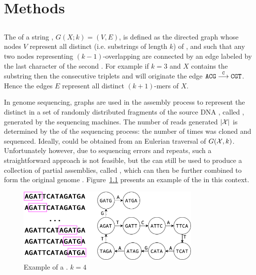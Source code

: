 \chapter{Methods}

\section{}
\label{sec:dBG}


The  of a string , $G(X;k)=(V,E)$, is defined as the directed graph whose nodes $V$ represent all distinct  (i.e. substrings of length $k$) of , and such that any two nodes representing $(k-1)$-overlapping  are connected by an edge labeled by the last character of the second \kmer. For example if $k=3$ and $X$ contains the substring  then the consecutive triplets  and  will originate the edge $\mathtt{ACG}\stackrel{\mathtt{C}}{\longrightarrow}\mathtt{CGT}$. Hence the edges $E$ represent all distinct $(k+1)$-mers of $X$. 

In genome sequencing, \dB graphs are used in the assembly process to represent the distinct  in a set \readset of randomly distributed fragments of the source DNA , called , generated by the sequencing machines. The number of reads generated $|\readset|$ is determined by the  of the sequencing process: the number of times  was cloned and sequenced. Ideally,  could be obtained from an Eulerian traversal of $G(\readset, k)$. Unfortunately however, due to sequencing errors and repeats, such a straightforward approach is not feasible, but the \dBG can still be used to produce a collection of partial assemblies, called , which can then be further combined to form the original genome \cite{Pevzner2001}. Figure~\ref{fig:dbgexample} presents an example of the \dBG in this context.

\begin{figure}[htbp]
	\begin{center}
    \includegraphics[width=0.8\textwidth]{figures/dbg-example}
	\end{center}
	\caption{Example of a \dBG. $k=4$}\label{fig:dbgexample}
\end{figure}


